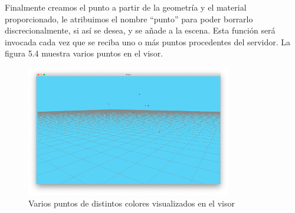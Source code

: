 Finalmente creamos el punto a partir de la geometría y el material proporcionado, le atribuimos el nombre ``punto'' para poder borrarlo discrecionalmente, si así se desea, y se añade a la escena.
Esta función será invocada cada vez que se reciba uno o más puntos procedentes del servidor. La figura 5.4 muestra varios puntos en el visor.
\begin{figure}[H]
  \begin{center}
    \includegraphics[width=0.8\textwidth]{figures/visualizarpuntos.png}
		\caption{Varios puntos de distintos colores visualizados en el visor}
		\label{fig.visualizarpuntos}
		\end{center}
\end{figure}

